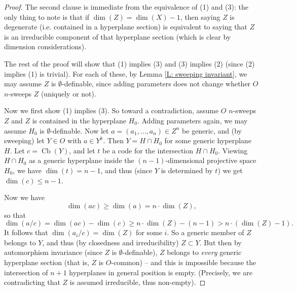 \documentclass{amsart}
\theoremstyle{definition}
\begin{document}
\begin{proof}

    The second clause is immediate from the equivalence of (1) and (3): the only thing to note is that if $\dim(Z)=\dim(X)-1$, then saying $Z$ is degenerate (i.e. contained in a hyperplane section) is equivalent to saying that $Z$ is an irreducible component of that hyperplane section (which is clear by dimension considerations).

    
    The rest of the proof will show that (1) implies (3) and (3) implies (2) (since (2) implies (1) is trivial). For each of these, by Lemma \ref{L: sweeping invariant}, we may assume $Z$ is $\emptyset$-definable, since adding parameters does not change whether $O$ $n$-sweeps $Z$ (uniquely or not).
    
    Now we first show (1) implies (3). So toward a contradiction, assume $O$ $n$-sweeps $Z$ and $Z$ is contained in the hyperplane $H_0$. Adding parameters again, we may assume $H_0$ is $\emptyset$-definable. Now let $a=(a_1,...,a_n)\in Z^n$ be generic, and (by sweeping) let $Y\in O$ with $a\in Y^k$. Then $Y=H\cap H_0$ for some generic hyperplane $H$. Let $c=\operatorname{Cb}(Y)$, and let $t$ be a code for the intersection $H\cap H_0$. Viewing $H\cap H_0$ as a generic hyperplane inside the $(n-1)$-dimensional projective space $H_0$, we have $\dim(t)=n-1$, and thus (since $Y$ is determined by $t$) we get $\dim(c)\leq n-1$.
    
    Now we have $$\dim(ac)\geq\dim(a)=n\cdot\dim(Z),$$ so that $$\dim(a/c)=\dim(ac)-\dim(c)\geq n\cdot\dim(Z)-(n-1)>n\cdot(\dim(Z)-1).$$ It follows that $\dim(a_i/c)=\dim(Z)$ for some $i$. So a generic member of $Z$ belongs to $Y$, and thus (by closedness and irreducibility) $Z\subset Y$. But then by automorphism invariance (since $Z$ is $\emptyset$-definable), $Z$ belongs to \textit{every} generic hyperplane section (that is, $Z$ is $O$-common) -- and this is impossible because the intersection of $n+1$ hyperplanes in general position is empty. (Precisely, we are contradicting that $Z$ is assumed irreducible, thus non-empty).
    

\end{proof}
\end{document}
